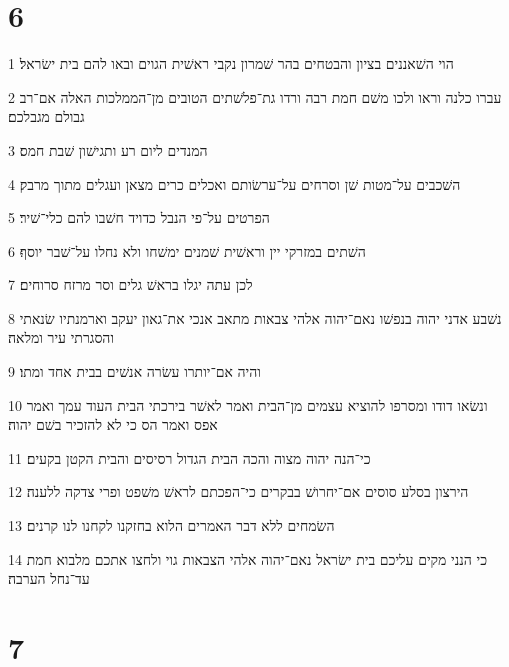 \chapter{6}

\par 1 הוי השׁאננים בציון והבטחים בהר שׁמרון נקבי ראשׁית הגוים ובאו להם בית ישׂראל׃
\par 2 עברו כלנה וראו ולכו משׁם חמת רבה ורדו גת־פלשׁתים הטובים מן־הממלכות האלה אם־רב גבולם מגבלכם׃
\par 3 המנדים ליום רע ותגישׁון שׁבת חמס׃
\par 4 השׁכבים על־מטות שׁן וסרחים על־ערשׂותם ואכלים כרים מצאן ועגלים מתוך מרבק׃
\par 5 הפרטים על־פי הנבל כדויד חשׁבו להם כלי־שׁיר׃
\par 6 השׁתים במזרקי יין וראשׁית שׁמנים ימשׁחו ולא נחלו על־שׁבר יוסף׃
\par 7 לכן עתה יגלו בראשׁ גלים וסר מרזח סרוחים׃
\par 8 נשׁבע אדני יהוה בנפשׁו נאם־יהוה אלהי צבאות מתאב אנכי את־גאון יעקב וארמנתיו שׂנאתי והסגרתי עיר ומלאה׃
\par 9 והיה אם־יותרו עשׂרה אנשׁים בבית אחד ומתו׃
\par 10 ונשׂאו דודו ומסרפו להוציא עצמים מן־הבית ואמר לאשׁר בירכתי הבית העוד עמך ואמר אפס ואמר הס כי לא להזכיר בשׁם יהוה׃
\par 11 כי־הנה יהוה מצוה והכה הבית הגדול רסיסים והבית הקטן בקעים׃
\par 12 הירצון בסלע סוסים אם־יחרושׁ בבקרים כי־הפכתם לראשׁ משׁפט ופרי צדקה ללענה׃
\par 13 השׂמחים ללא דבר האמרים הלוא בחזקנו לקחנו לנו קרנים׃
\par 14 כי הנני מקים עליכם בית ישׂראל נאם־יהוה אלהי הצבאות גוי ולחצו אתכם מלבוא חמת עד־נחל הערבה׃

\chapter{7}

